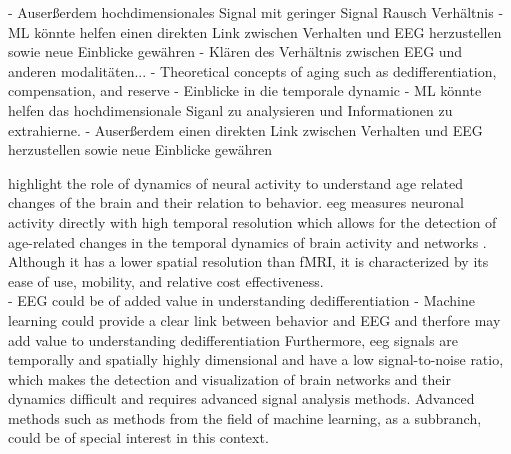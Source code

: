 - Auserßerdem hochdimensionales Signal mit geringer Signal Rausch Verhältnis 
- ML könnte helfen einen direkten Link zwischen Verhalten und EEG herzustellen sowie neue Einblicke gewähren 
- Klären des Verhältnis zwischen EEG und anderen modalitäten... 
- Theoretical concepts of aging such as dedifferentiation, compensation, and reserve
- Einblicke in die temporale dynamic 
- ML könnte helfen das hochdimensionale Siganl zu analysieren und Informationen zu extrahierne. 
- Auserßerdem einen direkten Link zwischen Verhalten und EEG herzustellen sowie neue Einblicke gewähren 




\citeauthor{Courtney2021} \cite{Courtney2021} highlight the role of dynamics of neural activity to understand age related changes of the brain and their relation to behavior. \Gls{eeg} measures neuronal activity directly with high temporal resolution which allows for the detection of age-related changes in the temporal dynamics of brain activity and networks \cite{Courtney2021}. Although it has a lower spatial resolution than fMRI, it is characterized by its ease of use, mobility, and relative cost effectiveness. \\



- EEG could be of added value in understanding dedifferentiation
- Machine learning could provide a clear link between behavior and EEG and therfore may add value to understanding dedifferentiation 
 Furthermore, \gls{eeg} signals are temporally and spatially highly dimensional and have a low signal-to-noise ratio, which makes the detection and visualization of brain networks and their dynamics difficult and requires advanced signal analysis methods. Advanced methods such as methods from the field of machine learning, as a subbranch, could be of special interest in this context.\\


